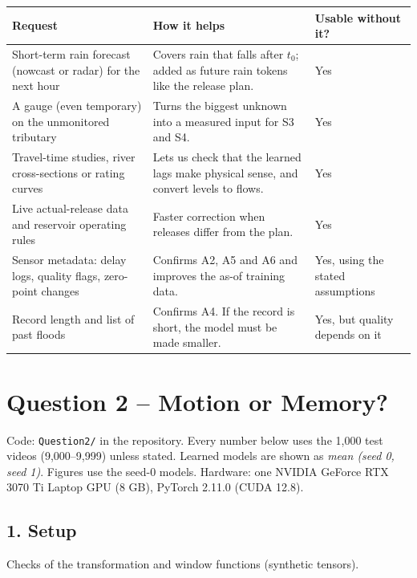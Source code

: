\documentclass[11pt,a4paper]{article}
\begin{document}
\begin{longtable}{|L{5.5cm}|L{6.4cm}|L{3.7cm}|}
\hline
\textbf{Request} & \textbf{How it helps} & \textbf{Usable without it?} \\ \hline
\endhead
Short-term rain forecast (nowcast or radar) for the next hour & Covers rain that falls after $t_0$; added as future rain tokens like the release plan. & Yes \\ \hline
A gauge (even temporary) on the unmonitored tributary & Turns the biggest unknown into a measured input for S3 and S4. & Yes \\ \hline
Travel-time studies, river cross-sections or rating curves & Lets us check that the learned lags make physical sense, and convert levels to flows. & Yes \\ \hline
Live actual-release data and reservoir operating rules & Faster correction when releases differ from the plan. & Yes \\ \hline
Sensor metadata: delay logs, quality flags, zero-point changes & Confirms A2, A5 and A6 and improves the as-of training data. & Yes, using the stated assumptions \\ \hline
Record length and list of past floods & Confirms A4. If the record is short, the model must be made smaller. & Yes, but quality depends on it \\ \hline
\end{longtable}

\newpage
\section*{Question 2 -- Motion or Memory?}
\setcounter{table}{0}%

Code: \texttt{Question2/} in the repository. Every number below uses the 1,000 test videos (9,000--9,999) unless stated. Learned models are shown as \emph{mean (seed 0, seed 1)}. Figures use the seed-0 models. Hardware: one NVIDIA GeForce RTX 3070 Ti Laptop GPU (8 GB), PyTorch 2.11.0 (CUDA 12.8).

\subsection*{1. Setup}

\begin{table}[H]
  \centering\small
  \caption{Checks of the transformation and window functions (synthetic tensors).}
  \resizebox{\textwidth}{!}{}
\end{table}
\end{document}
